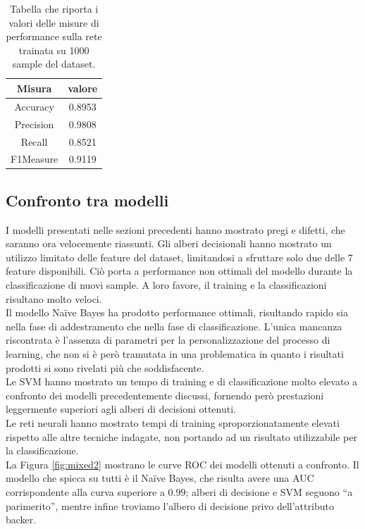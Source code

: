 \begin{table}
	\caption{Tabella che riporta i valori delle misure di performance sulla rete trainata su 1000 sample del dataset.}
	\label{tab:nnperformance}
	\centering
	\begin{tabular}{c|c}
		Misura & valore \\
		\hline
		Accuracy & 0.8953  \\ 
		Precision & 0.9808  \\
		Recall & 0.8521  \\
		F1Measure & 0.9119  \\
	\end{tabular}
\end{table}

\subsection{Confronto tra modelli}
I modelli presentati nelle sezioni precedenti hanno mostrato pregi e difetti, che saranno ora velocemente riassunti.
Gli alberi decisionali hanno mostrato un utilizzo limitato delle feature del dataset, limitandosi a sfruttare solo due delle 7 feature disponibili. Ciò porta a performance non ottimali del modello durante la classificazione di nuovi sample. A loro favore, il training e la classificazioni risultano molto veloci.\\
Il modello Na\"ive Bayes ha prodotto performance ottimali, risultando rapido sia nella fase di addestramento che nella fase di classificazione. L'unica mancanza riscontrata è l'assenza di parametri per la personalizzazione del processo di learning, che non si è però tramutata in una problematica in quanto i risultati prodotti si sono rivelati più che soddisfacente.\\
Le SVM hanno mostrato un tempo di training e di classificazione molto elevato a confronto dei modelli precedentemente discussi, fornendo però prestazioni leggermente superiori agli alberi di decisioni ottenuti.\\
Le reti neurali hanno mostrato tempi di training sproporzionatamente elevati rispetto alle altre tecniche indagate, non portando ad un risultato utilizzabile per la classificazione.\\
La Figura \ref{fig:mixed2} mostrano le curve ROC dei modelli ottenuti a confronto. Il modello che spicca su tutti è il Na\"ive Bayes, che risulta  avere una AUC corrispondente alla curva superiore a $0.99$; alberi di decisione e SVM seguono “a parimerito”, mentre infine troviamo l'albero di decisione privo dell'attributo backer.
